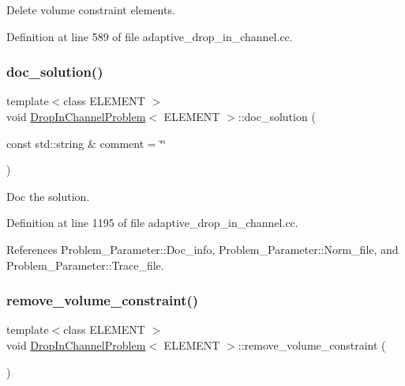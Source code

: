 Delete volume constraint elements. 



Definition at line 589 of file adaptive\+\_\+drop\+\_\+in\+\_\+channel.\+cc.

\mbox{\label{classDropInChannelProblem_a3bcebc0cd731b75db441f3e1d62296ae}} 
\subsubsection{\texorpdfstring{doc\+\_\+solution()}{doc\_solution()}}
{\footnotesize\ttfamily template$<$class E\+L\+E\+M\+E\+NT $>$ \\
void \hyperlink{classDropInChannelProblem}{Drop\+In\+Channel\+Problem}$<$ E\+L\+E\+M\+E\+NT $>$\+::doc\+\_\+solution (\begin{DoxyParamCaption}\item[{const std\+::string \&}]{comment = {\ttfamily \char`\"{}\char`\"{}} }\end{DoxyParamCaption})}



Doc the solution. 



Definition at line 1195 of file adaptive\+\_\+drop\+\_\+in\+\_\+channel.\+cc.



References Problem\+\_\+\+Parameter\+::\+Doc\+\_\+info, Problem\+\_\+\+Parameter\+::\+Norm\+\_\+file, and Problem\+\_\+\+Parameter\+::\+Trace\+\_\+file.

\mbox{\label{classDropInChannelProblem_ab8a7491ab12974ccc4cc10bfc0f20675}} 
\subsubsection{\texorpdfstring{remove\+\_\+volume\+\_\+constraint()}{remove\_volume\_constraint()}}
{\footnotesize\ttfamily template$<$class E\+L\+E\+M\+E\+NT $>$ \\
void \hyperlink{classDropInChannelProblem}{Drop\+In\+Channel\+Problem}$<$ E\+L\+E\+M\+E\+NT $>$\+::remove\+\_\+volume\+\_\+constraint (\begin{DoxyParamCaption}{ }\end{DoxyParamCaption})\hspace{0.3cm}{\ttfamily [inline]}}



